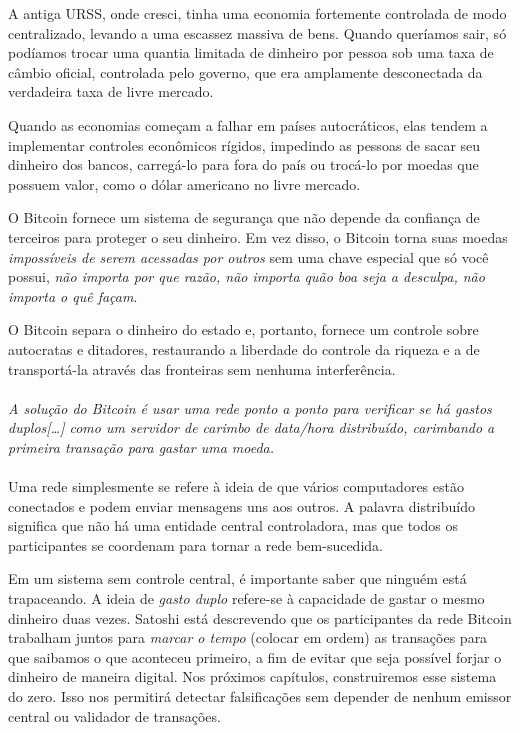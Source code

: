 A antiga URSS, onde cresci, tinha uma economia fortemente controlada de modo centralizado, levando a uma escassez massiva de bens. Quando queríamos sair, só podíamos trocar uma quantia limitada de dinheiro por pessoa sob uma taxa de câmbio oficial, controlada pelo governo, que era amplamente desconectada da verdadeira taxa de livre mercado.

Quando as economias começam a falhar em países autocráticos, elas tendem a implementar controles econômicos rígidos, impedindo as pessoas de sacar seu dinheiro dos bancos, carregá-lo para fora do país ou trocá-lo por moedas que possuem valor, como o dólar americano no livre mercado.

O Bitcoin fornece um sistema de segurança que não depende da confiança de terceiros para proteger o seu dinheiro. Em vez disso, o Bitcoin torna suas moedas \textit{impossíveis de serem acessadas por outros} sem uma chave especial que só você possui, \textit{não importa por que razão, não importa quão boa seja a desculpa, não importa o quê façam}.

O Bitcoin separa o dinheiro do estado e, portanto, fornece um controle sobre autocratas e ditadores, restaurando a liberdade do controle da riqueza e a de transportá-la através das fronteiras sem nenhuma interferência.
\paragraph{}
\textit{A solução do Bitcoin é usar uma rede ponto a ponto para verificar se há gastos duplos[\ldots] como um servidor de carimbo de data/hora distribuído, carimbando a primeira transação para gastar uma moeda.}
\paragraph{}
Uma rede simplesmente se refere à ideia de que vários computadores estão conectados e podem enviar mensagens uns aos outros. A palavra distribuído significa que não há uma entidade central controladora, mas que todos os participantes se coordenam para tornar a rede bem-sucedida.

Em um sistema sem controle central, é importante saber que ninguém está trapaceando. A ideia de \textit{gasto duplo} refere-se à capacidade de gastar o mesmo dinheiro duas vezes. Satoshi está descrevendo que os participantes da rede Bitcoin trabalham juntos para \textit{marcar o tempo} (colocar em ordem) as transações para que saibamos o que aconteceu primeiro, a fim de evitar que seja possível forjar o dinheiro de maneira digital. Nos próximos capítulos, construiremos esse sistema do zero. Isso nos permitirá detectar falsificações sem depender de nenhum emissor central ou validador de transações.


